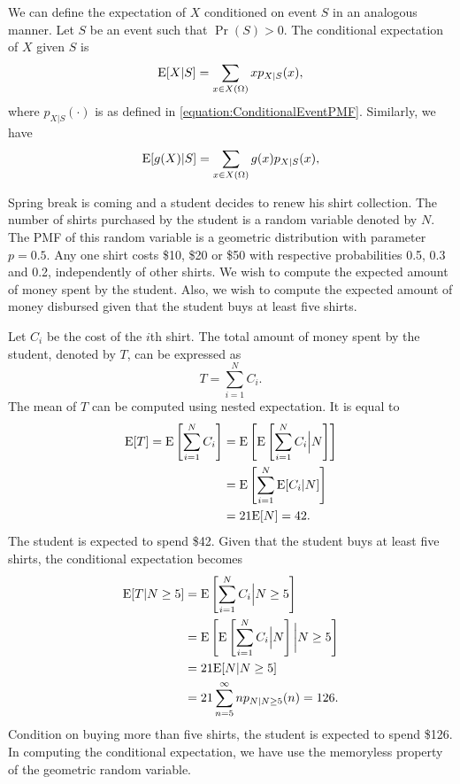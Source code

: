 We can define the expectation of $X$ conditioned on event $S$ in an analogous manner.
Let $S$ be an event such that $\Pr (S) > 0$.
The conditional expectation of $X$ given $S$ is
\begin{equation*}
\mathrm{E} [X | S] = \sum_{x \in X(\Omega)} x p_{X|S} (x) ,
\end{equation*}
where $p_{X|S} (\cdot)$ is as defined in \eqref{equation:ConditionalEventPMF}.
Similarly, we have
\begin{equation*}
\mathrm{E} [g(X) | S] = \sum_{x \in X(\Omega)} g(x) p_{X|S} (x) ,
\end{equation*}

\begin{example}
Spring break is coming and a student decides to renew his shirt collection.
The number of shirts purchased by the student is a random variable denoted by $N$.
The PMF of this random variable is a geometric distribution with parameter $p = 0.5$.
Any one shirt costs \$10, \$20 or \$50 with respective probabilities 0.5, 0.3 and 0.2, independently of other shirts.
We wish to compute the expected amount of money spent by the student.
Also, we wish to compute the expected amount of money disbursed given that the student buys at least five shirts.

Let $C_i$ be the cost of the $i$th shirt.
The total amount of money spent by the student, denoted by $T$, can be expressed as
\begin{equation*}
T = \sum_{i=1}^N C_i .
\end{equation*}
The mean of $T$ can be computed using nested expectation.
It is equal to
\begin{equation*}
\begin{split}
\mathrm{E} [T] = \mathrm{E} \left[ \sum_{i=1}^N C_i \right]
&= \mathrm{E} \left[ \mathrm{E} \left[
\sum_{i=1}^N C_i \Big| N \right] \right] \\
&= \mathrm{E} \left[ \sum_{i=1}^N \mathrm{E} [ C_i | N ] \right] \\
&= 21 \mathrm{E} [ N ] = 42.
\end{split}
\end{equation*}
The student is expected to spend \$42.
Given that the student buys at least five shirts, the conditional expectation becomes
\begin{equation*}
\begin{split}
\mathrm{E} [T | N \geq 5]
&= \mathrm{E} \left[ \sum_{i=1}^N C_i \Big| N \geq 5 \right] \\
&= \mathrm{E} \left[ \mathrm{E} \left[
\sum_{i=1}^N C_i \Big| N \right] \bigg| N \geq 5 \right] \\
&= 21 \mathrm{E} [ N | N \geq 5] \\
&= 21 \sum_{n=5}^{\infty} n p_{N | N \geq 5} (n)
= 126 .
\end{split}
\end{equation*}
Condition on buying more than five shirts, the student is expected to spend \$126.
In computing the conditional expectation, we have use the memoryless property of the geometric random variable.
\end{example}


